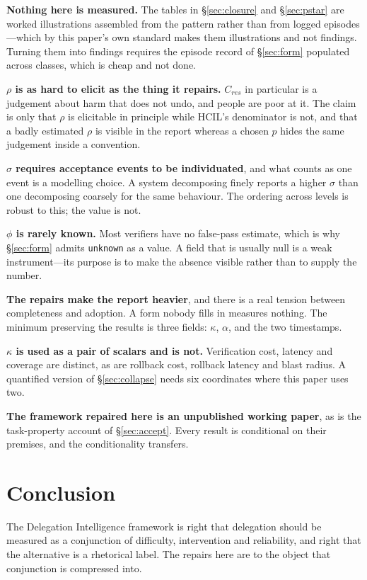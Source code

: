 \documentclass[11pt]{article}
\theoremstyle{definition}
\newcommand{\kap}{\ensuremath{\kappa}}
\begin{document}
\textbf{Nothing here is measured.} The tables in \S\ref{sec:closure} and \S\ref{sec:pstar} are worked illustrations assembled from the pattern rather than from logged episodes---which by this paper's own standard makes them illustrations and not findings. Turning them into findings requires the episode record of \S\ref{sec:form} populated across classes, which is cheap and not done.

\textbf{$\rho$ is as hard to elicit as the thing it repairs.} $C_{res}$ in particular is a judgement about harm that does not undo, and people are poor at it. The claim is only that $\rho$ is elicitable in principle while HCIL's denominator is not, and that a badly estimated $\rho$ is visible in the report whereas a chosen $p$ hides the same judgement inside a convention.

\textbf{$\sigma$ requires acceptance events to be individuated}, and what counts as one event is a modelling choice. A system decomposing finely reports a higher $\sigma$ than one decomposing coarsely for the same behaviour. The ordering across levels is robust to this; the value is not.

\textbf{$\phi$ is rarely known.} Most verifiers have no false-pass estimate, which is why \S\ref{sec:form} admits \texttt{unknown} as a value. A field that is usually null is a weak instrument---its purpose is to make the absence visible rather than to supply the number.

\textbf{The repairs make the report heavier}, and there is a real tension between completeness and adoption. A form nobody fills in measures nothing. The minimum preserving the results is three fields: \kap{}, $\alpha$, and the two timestamps.

\textbf{\kap{} is used as a pair of scalars and is not.} Verification cost, latency and coverage are distinct, as are rollback cost, rollback latency and blast radius. A quantified version of \S\ref{sec:collapse} needs six coordinates where this paper uses two.

\textbf{The framework repaired here is an unpublished working paper}, as is the task-property account of \S\ref{sec:accept}. Every result is conditional on their premises, and the conditionality transfers.

\section{Conclusion}

The Delegation Intelligence framework is right that delegation should be measured as a conjunction of difficulty, intervention and reliability, and right that the alternative is a rhetorical label. The repairs here are to the object that conjunction is compressed into.
\end{document}
